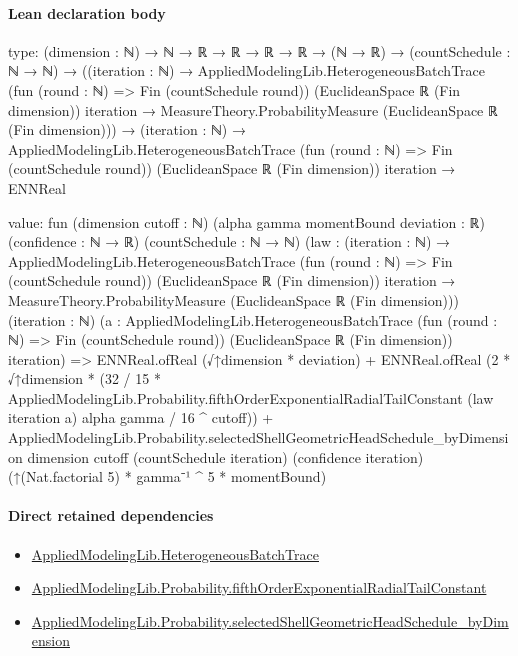 \documentclass[10pt]{article}
\begin{document}
\paragraph{Lean declaration body}
\begin{ReviewVerbatim}
type:
(dimension : ℕ) →
  ℕ →
    ℝ →
      ℝ →
        ℝ →
          ℝ →
            (ℕ → ℝ) →
              (countSchedule : ℕ → ℕ) →
                ((iteration : ℕ) →
                    AppliedModelingLib.HeterogeneousBatchTrace (fun (round : ℕ) => Fin (countSchedule round))
                        (EuclideanSpace ℝ (Fin dimension)) iteration →
                      MeasureTheory.ProbabilityMeasure (EuclideanSpace ℝ (Fin dimension))) →
                  (iteration : ℕ) →
                    AppliedModelingLib.HeterogeneousBatchTrace (fun (round : ℕ) => Fin (countSchedule round))
                        (EuclideanSpace ℝ (Fin dimension)) iteration →
                      ENNReal

value:
fun (dimension cutoff : ℕ) (alpha gamma momentBound deviation : ℝ) (confidence : ℕ → ℝ) (countSchedule : ℕ → ℕ)
    (law :
      (iteration : ℕ) →
        AppliedModelingLib.HeterogeneousBatchTrace (fun (round : ℕ) => Fin (countSchedule round))
            (EuclideanSpace ℝ (Fin dimension)) iteration →
          MeasureTheory.ProbabilityMeasure (EuclideanSpace ℝ (Fin dimension)))
    (iteration : ℕ)
    (a :
      AppliedModelingLib.HeterogeneousBatchTrace (fun (round : ℕ) => Fin (countSchedule round))
        (EuclideanSpace ℝ (Fin dimension)) iteration) =>
  ENNReal.ofReal (√↑dimension * deviation) +
      ENNReal.ofReal
        (2 * √↑dimension *
          (32 / 15 *
              AppliedModelingLib.Probability.fifthOrderExponentialRadialTailConstant (law iteration a) alpha gamma /
            16 ^ cutoff)) +
    AppliedModelingLib.Probability.selectedShellGeometricHeadSchedule_byDimension dimension cutoff
      (countSchedule iteration) (confidence iteration) (↑(Nat.factorial 5) * gamma⁻¹ ^ 5 * momentBound)
\end{ReviewVerbatim}

\paragraph{Direct retained dependencies}
\begin{itemize}\raggedright
\item \hyperlink{governing-declaration-307f711c4bf618c0}{Applied\allowbreak{}Modeling\allowbreak{}Lib.\allowbreak{}Heterogeneous\allowbreak{}Batch\allowbreak{}Trace}
\item \hyperlink{governing-declaration-93c495b865c4b878}{Applied\allowbreak{}Modeling\allowbreak{}Lib.\allowbreak{}Probability.\allowbreak{}fifth\allowbreak{}Order\allowbreak{}Exponential\allowbreak{}Radial\allowbreak{}Tail\allowbreak{}Constant}
\item \hyperlink{governing-declaration-c0a245a76db0d804}{Applied\allowbreak{}Modeling\allowbreak{}Lib.\allowbreak{}Probability.\allowbreak{}selected\allowbreak{}Shell\allowbreak{}Geometric\allowbreak{}Head\allowbreak{}Schedule\_\allowbreak{}by\allowbreak{}Dimension}
\end{itemize}
\hypertarget{governing-declaration-7aef644371a72bc3}{}
\end{document}
